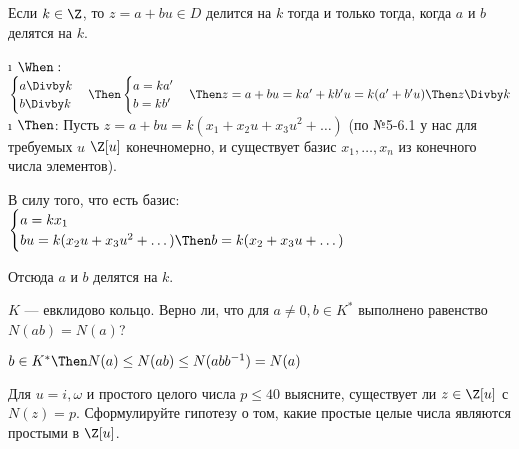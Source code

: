 \begin{problem}[11 (2.5)]
Если $k \in \Z$, то $z= a+bu \in D$ делится на $k$ тогда и только тогда, когда $a$ и $b$ делятся на $k$.
\end{problem}

\begin{solution}

\begin{itemize}
\i
  \(\When:\)
  \(\begin{cases} a \Divby k \\ b \Divby k \end{cases} \Then \begin{cases} a = ka' \\ b = kb' \end{cases} \Then z = a+bu = ka'+kb'u=k(a'+b'u) \Then z \Divby k\)
\i
  \(\Then\):
  Пусть \(z = a + bu = k(x_1+x_2u+x_3u^2+\dots)\) (по №5-6.1 у нас для требуемых $u$ $\Z[u]$ конечномерно, и существует базис $x_1, \dots, x_n$ из конечного числа элементов).
  
  В силу того, что есть базис:
  $\begin{cases}
	a=kx_1\\
	bu=k(x_2u+x_3u^2+\dots) \Then b=k(x_2+x_3u+\dots)
  \end{cases}$
	
	Отсюда $a$ и $b$ делятся на $k$.
\end{itemize}

\end{solution}

\begin{problem}[12(2.9 $\When$)]
$K$ — евклидово кольцо. Верно ли, что для $a \ne 0, b \in K^*$ выполнено равенство $N(ab) = N(a)$?
\end{problem}

\begin{solution}
\(b \in K^* \Then N(a) \le N(ab) \le N(abb^{-1}) = N(a)\)
\end{solution}

\begin{problem}[13 (3.2)]
Для $u=i,\omega$ и простого целого числа $p \leq 40$ выясните, существует ли $z \in \Z[u]$ с $N(z)=p$. Сформулируйте гипотезу о том, какие простые целые числа являются простыми в $\Z[u]$. 
\end{problem}

